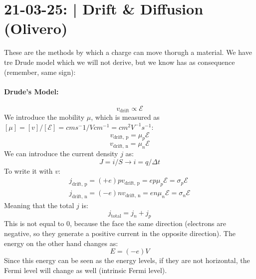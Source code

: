 \section{21-03-25: | Drift \& Diffusion (Olivero)}

These are the methods by which a charge can move thorugh a material. We have tre Drude model which we will not derive, but we know has as consequence (remember, same sign):
\paragraph{Drude's Model:}
\begin{equation}
    v_{\text{drift}} \propto \mathcal{E}
\end{equation}
We introduce the mobility $\mu$, which is measured as $[\mu] = [v] / [\mathcal{E}] = cms^-1 / Vcm^{-1} = cm^2V^{-1}s^{-1}$: 
\begin{equation}
    v_{\text{drift, p}} = \mu_p \mathcal{E}
\end{equation}
\begin{equation}
    v_{\text{drift, n}} = \mu_n \mathcal{E}
\end{equation}
We can introduce the current density $j$ as:
\begin{equation}
    J = i / S \rightarrow i = q / \Delta t 
\end{equation}
To write it with $v$:
\begin{equation}
    \begin{aligned}
        j_{\text{drift, p}} = (+e)p v_{\text{drift, p}} = ep\mu_p\mathcal{E} = \sigma_p \mathcal{E}\\
        j_{\text{drift, n}} = (-e)n v_{\text{drift, n}} = en\mu_n\mathcal{E} = \sigma_n \mathcal{E}
    \end{aligned}
\end{equation}
Meaning that the total $j$ is:
\begin{equation}
    j_{\text{total}} = j_n + j_p
\end{equation}
This is not equal to 0, because the face the same direction (electrons are negative, so they generate a positive current in the opposite direction). The energy on the other hand changes as:
\begin{equation}
    E = (-e) V
\end{equation}
Since this energy can be seen as the energy levels, if they are not horizontal, the Fermi level will change as well (intrinsic Fermi level).

